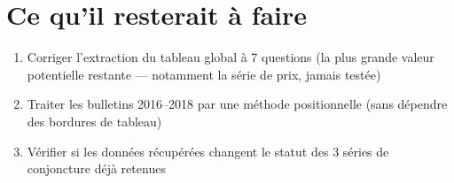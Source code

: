 \documentclass[11pt,a4paper]{article}
\begin{document}
\section{Ce qu'il resterait à faire}

\begin{enumerate}[leftmargin=1.4em]
\item Corriger l'extraction du tableau global à 7 questions (la plus grande valeur potentielle restante --- notamment la série de prix, jamais testée)
\item Traiter les bulletins 2016--2018 par une méthode positionnelle (sans dépendre des bordures de tableau)
\item Vérifier si les données récupérées changent le statut des 3 séries de conjoncture déjà retenues
\end{enumerate}
\end{document}
